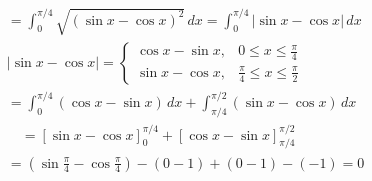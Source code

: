 \documentclass{article}
\begin{document}
\begin{align*}
& = \int_0^{\pi/4} \sqrt{(\sin x - \cos x)^2} \, dx = \int_0^{\pi/4} |\sin x - \cos x| \, dx \\
& | \sin x - \cos x | = 
\begin{cases} 
\cos x - \sin x, & 0 \leq x \leq \frac{\pi}{4} \\
\sin x - \cos x, & \frac{\pi}{4} \leq x \leq \frac{\pi}{2} 
\end{cases} \\
& = \int_0^{\pi/4} (\cos x - \sin x) \, dx + \int_{\pi/4}^{\pi/2} (\sin x - \cos x) \, dx \\
& \quad = \left[ \sin x - \cos x \right]_0^{\pi/4} + \left[ \cos x - \sin x \right]_{\pi/4}^{\pi/2} \\
& = (\sin \frac{\pi}{4} - \cos \frac{\pi}{4}) - (0 - 1) + (0 - 1) - (-1) = 0
\end{align*}
\end{document}
